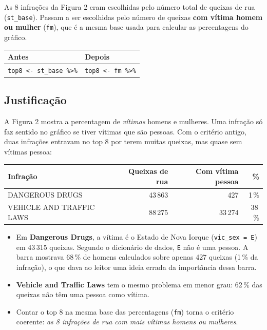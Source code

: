 \documentclass[11pt,a4paper]{article}
\begin{document}
As 8 infrações da Figura 2 eram escolhidas pelo número total de queixas de rua
(\texttt{st\_base}). Passam a ser escolhidas pelo número de queixas \textbf{com vítima homem ou mulher}
(\texttt{fm}), que é a mesma base usada para calcular as percentagens do gráfico.

\begin{center}\small
\begin{tabular}{@{}ll@{}}
\toprule
\textbf{Antes} & \textbf{Depois}\\
\midrule
\texttt{top8 <- st\_base \%>\%} & \texttt{top8 <- fm \%>\%}\\
\bottomrule
\end{tabular}
\end{center}

\subsection*{Justificação}

A Figura 2 mostra a percentagem de \emph{vítimas} homens e mulheres. Uma infração só faz sentido
no gráfico se tiver vítimas que são pessoas. Com o critério antigo, duas infrações entravam no
top 8 por terem muitas queixas, mas quase sem vítimas pessoa:

\begin{center}\small
\begin{tabular}{@{}lrrr@{}}
\toprule
\textbf{Infração} & \textbf{Queixas de rua} & \textbf{Com vítima pessoa} & \textbf{\%}\\
\midrule
DANGEROUS DRUGS          & 43\,863 & 427     & 1\,\%\\
VEHICLE AND TRAFFIC LAWS & 88\,275 & 33\,274 & 38\,\%\\
\bottomrule
\end{tabular}
\end{center}

\begin{itemize}
  \item Em \textbf{Dangerous Drugs}, a vítima é o Estado de Nova Iorque (\texttt{vic\_sex = E})
        em 43\,315 queixas. Segundo o dicionário de dados, \texttt{E} não é uma pessoa. A barra
        mostrava 68\,\% de homens calculados sobre apenas 427 queixas (1\,\% da infração), o que
        dava ao leitor uma ideia errada da importância dessa barra.
  \item \textbf{Vehicle and Traffic Laws} tem o mesmo problema em menor grau: 62\,\% das queixas
        não têm uma pessoa como vítima.
  \item Contar o top 8 na mesma base das percentagens (\texttt{fm}) torna o critério coerente:
        \emph{as 8 infrações de rua com mais vítimas homens ou mulheres}.
\end{itemize}
\end{document}
